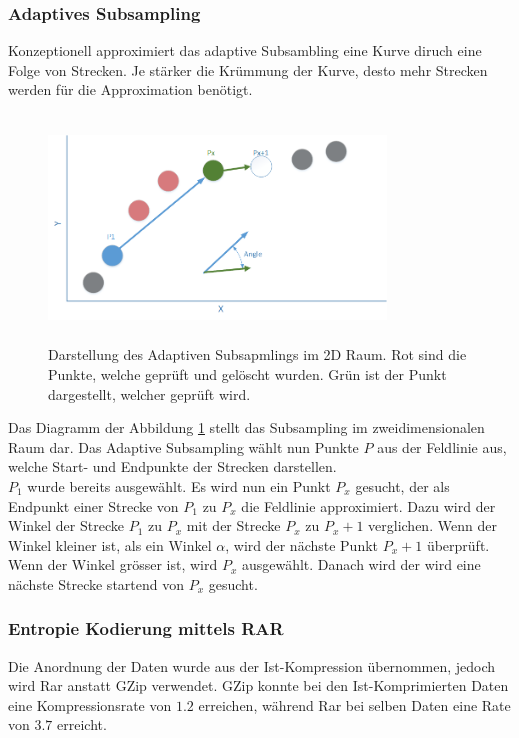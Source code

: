 \subsubsection{Adaptives Subsampling}\label{konzept:loesung0:subsampling}
Konzeptionell approximiert das adaptive Subsambling eine Kurve diruch eine Folge von Strecken. Je stärker die Krümmung der Kurve, desto mehr Strecken werden für die Approximation benötigt.

\begin{figure}[!htbp]
	\center
	\includegraphics[width=0.8\textwidth,height=6cm,keepaspectratio]{./pictures/konzept/solution0/anglesubsampling.png}
	\caption{Darstellung des Adaptiven Subsapmlings im 2D Raum. Rot sind die Punkte, welche geprüft und gelöscht wurden. Grün ist der Punkt dargestellt, welcher geprüft wird.}
	\label{konzept:loesung0:angle}
\end{figure}
Das Diagramm der Abbildung \ref{konzept:loesung0:angle} stellt das Subsampling im zweidimensionalen Raum dar. Das Adaptive Subsampling wählt nun Punkte $P$ aus der Feldlinie aus, welche Start- und Endpunkte der Strecken darstellen.\\
$P_1$ wurde bereits ausgewählt. Es wird nun ein Punkt $P_x$ gesucht, der als Endpunkt einer Strecke von $P_1$ zu $P_x$ die Feldlinie approximiert. Dazu wird der Winkel der Strecke $P_1$ zu $P_x$ mit der Strecke $P_x$ zu $P_x+1$ verglichen. Wenn der Winkel kleiner ist, als ein Winkel $\alpha$, wird der nächste Punkt $P_x+1$ überprüft. Wenn der Winkel grösser ist, wird $P_x$ ausgewählt. Danach wird der wird eine nächste Strecke startend von $P_x$ gesucht.

\subsubsection{Entropie Kodierung mittels RAR} \label{konzept:loesung0:kodierung}
Die Anordnung der Daten wurde aus der Ist-Kompression übernommen, jedoch wird Rar anstatt GZip verwendet. GZip konnte bei den Ist-Komprimierten Daten eine Kompressionsrate von $1.2$ erreichen, während Rar bei selben Daten eine Rate von $3.7$ erreicht.
\pagebreak

